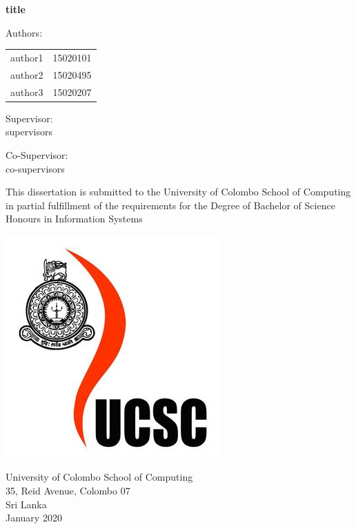 \documentclass[12pt,a4paper]{report}
\begin{document}
\begin{titlepage}
    \begin{center}
        \textbf{\huge{ \fontsize{24pt}{24pt}\selectfont title}}
        \vspace{1.5cm}
        
        Authors:\\
        \begin{center}
            \begin{tabular}{ l l }
                 author1 & 15020101  \\ 
                 author2 & 15020495  \\  
                 author3 & 15020207    
            \end{tabular}
        \end{center}
        \vspace{1cm}
        Supervisor:\\
        \vspace{0.2cm}
        \small{supervisors}\\
        \vspace{1cm}
        
        Co-Supervisor:\\
        \vspace{0.2cm}
        \small{co-supervisors}\\
        \vspace{1.5cm}
        
        This dissertation is submitted to the University of Colombo School of Computing in partial fulfillment of the requirements for the Degree of Bachelor of Science Honours in Information Systems
        \vspace{1.8cm}
        
        \includegraphics[scale=0.25]{ucsc.jpg}\\
        \vspace{1.5cm}
        
        University of Colombo School of Computing\\
        35, Reid Avenue, Colombo 07\\
        Sri Lanka\\
        January 2020
    \end{center}
\end{titlepage}
\end{document}
